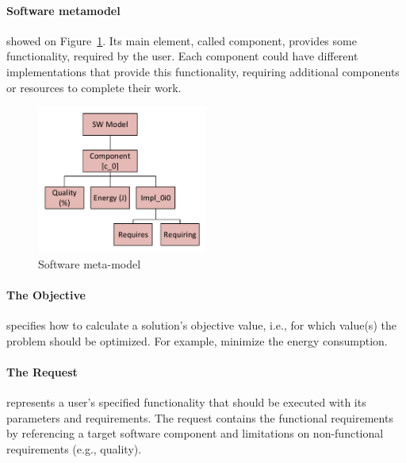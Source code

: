 \paragraph{Software metamodel} showed on Figure~\ref{fig:SWModel}. Its main element, called component, provides some functionality, required by the user.
Each component could have different implementations that provide this functionality, requiring additional components or resources to complete their work. 

\begin{figure}
	\centering
	\includegraphics[width=0.5\textwidth]{images/SWModel.pdf}
	\caption[Software meta-model]{Software meta-model}
	\label{fig:SWModel}
\end{figure}

\paragraph{The Objective} specifies how to calculate a solution's objective value, i.e., for which value(s) the problem should be optimized. For example, minimize the energy consumption.

\paragraph{The Request} represents a user's specified functionality that should be executed with its parameters and requirements.  The request contains the functional requirements by referencing a target software component and limitations on non-functional requirements (e.g., quality).\\


